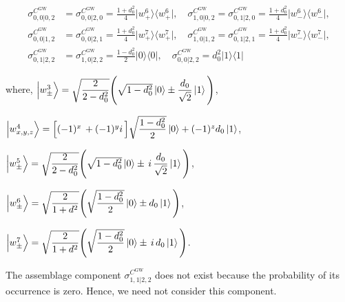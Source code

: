 \documentclass[reprint,superscriptaddress,nofootinbib,amsmath,amssymb,aps,pra,longbibliography]{revtex4-1}
\newcommand{\blu}{\color{blue}}
\begin{document}
\begin{widetext}
\begin{align}
     \sigma_{0,0|0,2}^{C^{\text{GW}}} &= \sigma_{0,0|2,0}^{C^{\text{GW}}} = \frac{1+d_0^2}{4}\Big| w_{+}^6 \Big\rangle \Big\langle w_{+}^6 \Big|,  \quad
     \sigma_{1,0|0,2}^{C^{\text{GW}}} = \sigma_{0,1|2,0}^{C^{\text{GW}}} = \frac{1+d_0^2}{4}\Big| w_{-}^6 \Big\rangle \Big\langle w_{-}^6 \Big|, \nonumber \\
     \sigma_{0,0|1,2}^{C^{\text{GW}}} &= \sigma_{0,0|2,1}^{C^{\text{GW}}} = \frac{1+d_0^2}{4}\Big| w_{+}^7 \Big\rangle \Big\langle w_{+}^7 \Big|, \quad 
     \sigma_{1,0|1,2}^{C^{\text{GW}}} = \sigma_{0,1|2,1}^{C^{\text{GW}}} = \frac{1+d_0^2}{4}\Big| w_{-}^7 \Big\rangle \Big\langle w_{-}^7 \Big|, \nonumber \\
      \sigma_{0,1|2,2}^{C^{\text{GW}}} &= \sigma_{1,0|2,2}^{C^{\text{GW}}} =  \frac{1-d_0^2}{2} \Big| 0 \Big\rangle \Big\langle 0 \Big| , \quad  \sigma_{0,0|2,2}^{C^{\text{GW}}} = d_0^2 \Big| 1 \Big\rangle \Big\langle 1 \Big| 
     \label{GW2SA}
\end{align}

where, $\Big| w_{\pm}^3 \Big\rangle = \sqrt{\dfrac{2}{2-d_0^2}} \Bigg( \sqrt{1-d_0^2} \ket{0} \pm \dfrac{d_0}{\sqrt{2}} \ket{1} \Bigg)$,

$\Big| w_{x,y,z}^4 \Big\rangle = \Big[ (-1)^x  \, + (-1)^y i\, \Big] \sqrt{\dfrac{1-d_0^2}{2}}  \ket{0} + (-1)^z d_0 \ket{1}$, 

$\Big| w_{\pm}^5 \Big\rangle = \sqrt{\dfrac{2}{2-d_0^2}} \Bigg( \sqrt{1-d_0^2} \ket{0} \pm \, i \, \dfrac{d_0}{\sqrt{2}} \ket{1} \Bigg)$,

$\Big| w_{\pm}^{6} \Big\rangle = \sqrt{\dfrac{2}{1+d^2}} \Bigg( \sqrt{\dfrac{1-d_0^2}{2}} \ket{0} \pm d_0 \ket{1} \Bigg)$,

$\Big| w_{\pm}^7 \Big\rangle = \sqrt{\dfrac{2}{1+d^2}} \Bigg( \sqrt{\dfrac{1-d_0^2}{2}} \ket{0} \pm \, i \, d_0 \ket{1} \Bigg)$.





The assemblage component $\sigma_{1,1|2,2}^{C^{\text{GW}}}$ does not exist because the probability of its occurrence is zero. Hence, we need not consider this component.


\end{widetext}
\end{document}
